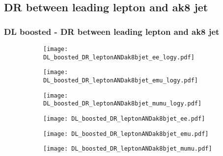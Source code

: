 \documentclass[aspectratio=169,8pt]{beamer}
\begin{document}
\subsection{DR between leading lepton and ak8 jet}
\begin{frame}
\frametitle{DL boosted - DR between leading lepton and ak8 jet}
\begin{figure}
\captionsetup[subfigure]{labelformat=empty}
\begin{subfigure}{0.32\textwidth}
\texttt{[image: DL\_boosted\_DR\_leptonANDak8bjet\_ee\_logy.pdf]}
\vspace*{-0.15cm}
\end{subfigure}
\hfil
\begin{subfigure}{0.32\textwidth}
\texttt{[image: DL\_boosted\_DR\_leptonANDak8bjet\_emu\_logy.pdf]}
\vspace*{-0.15cm}
\end{subfigure}
\hfil
\begin{subfigure}{0.32\textwidth}
\texttt{[image: DL\_boosted\_DR\_leptonANDak8bjet\_mumu\_logy.pdf]}
\vspace*{-0.15cm}
\end{subfigure}
\hfil
\begin{subfigure}{0.32\textwidth}
\texttt{[image: DL\_boosted\_DR\_leptonANDak8bjet\_ee.pdf]}
\vspace*{-0.15cm}
\end{subfigure}
\hfil
\begin{subfigure}{0.32\textwidth}
\texttt{[image: DL\_boosted\_DR\_leptonANDak8bjet\_emu.pdf]}
\vspace*{-0.15cm}
\end{subfigure}
\hfil
\begin{subfigure}{0.32\textwidth}
\texttt{[image: DL\_boosted\_DR\_leptonANDak8bjet\_mumu.pdf]}
\vspace*{-0.15cm}
\end{subfigure}
\hfil
\end{figure}
\end{frame}
\newpage
\end{document}
